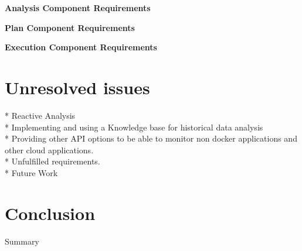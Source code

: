 \textbf{Analysis Component Requirements}
\begin{table}[H]
\caption{Analysis Component Functional Requirements evaluation}
\label{my-label3}
\end{table}

\textbf{Plan Component Requirements}
\begin{table}[H]
\caption{Plan Component Functional Requirements evaluation}
\label{my-label4}
\end{table}

\textbf{Execution Component Requirements}
\begin{table}[H]
\caption{Execution Component Functional Requirements evaluation}
\label{my-label5}
\end{table}

\section{Unresolved issues} %
* Reactive Analysis\\
* Implementing and using a Knowledge base for historical data analysis\\
* Providing other API options to be able to monitor non docker applications and other  cloud applications.\\
* Unfulfilled requirements.\\
* Future Work
\section{Conclusion}
Summary

